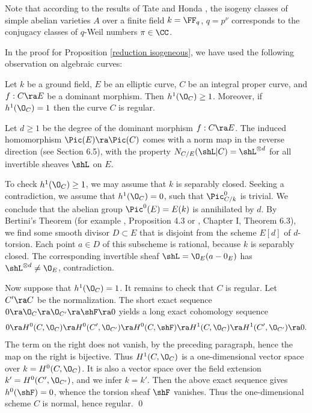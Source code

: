 Note that according to the results of  Tate \cite{Tate-1982} and Honda \cite{Honda-1968},
the isogeny classes of simple abelian varieties $A$ over a finite field $k=\FF_q$, $q=p^\nu$
corresponds to the conjugacy classes of $q$-Weil numbers $\pi\in\CC$.

In the proof for Proposition \ref{reduction isogeneous}, we have used the following observation on algebraic curves:

\begin{lemma}
\notready
\label{covering}
Let $k$ be a ground field, $E$ be an elliptic curve, $C$ be an integral proper curve, and $f:C\ra E$ be a dominant morphism.
Then  $h^1(\O_C)\geq 1$. Moreover,  if $h^1(\O_C)=1$ then the curve $C$ is regular.
\end{lemma}

\proof
Let $d\geq 1$ be the degree of the dominant morphism $f:C\ra E$.
The induced homomorphism $\Pic(E)\ra\Pic(C)$ comes with a norm map in the reverse direction (see \cite{EGA-II} Section 6.5),
with the property $N_{C/E}(\shL|C)=\shL^{\otimes d}$ for all invertible sheaves $\shL$ on $E$.

To check $h^1(\O_C)\geq 1$, we may assume that $k$ is separably closed.
Seeking a contradiction, we assume that $h^1(\O_C)=0$, such that $\Pic^0_{C/k}$ is trivial.
We conclude that the abelian group $\Pic^0(E)=E(k)$ is annihilated by $d$.
By Bertini's Theorem (for example \cite{EGA-V}, Proposition 4.3 or \cite{Jouanolou-1983}, Chapter I, Theorem 6.3), we find some smooth divisor $D\subset E$ that is disjoint
from the scheme $E[d]$ of $d$-torsion. Each point $a\in D$ of this subscheme is rational,
because $k$ is separably closed. The corresponding invertible sheaf $\shL=\O_E(a-0_E)$
 has $\shL^{\otimes d}\neq \O_E$, contradiction.

Now suppose that $h^1(\O_C)=1$.
It remains to check that $C$ is regular.
Let $C'\ra C$ be the normalization. The short exact sequence $0\ra\O_C\ra\O_{C'}\ra\shF\ra 0$
yields a long exact cohomology sequence
$$
0\ra H^0(C,\O_C)\ra H^0(C',\O_{C'})\ra H^0(C,\shF)\ra H^1(C,\O_C)\ra H^1(C',\O_{C'})\ra 0.
$$
The term on the right does not vanish, by the preceding paragraph, hence the map on the right is bijective.
Thus $H^1(C,\O_C)$ is a one-dimensional  vector space over $k=H^0(C,\O_C)$. It is also a vector space over the field extension $k'=H^0(C',\O_{C'})$,
and we infer $k=k'$.
Then the above exact sequence   gives $h^0(\shF)=0$,   whence the torsion sheaf $\shF$ vanishes.
Thus the one-dimensional scheme $C$ is normal, hence regular.
\qed


